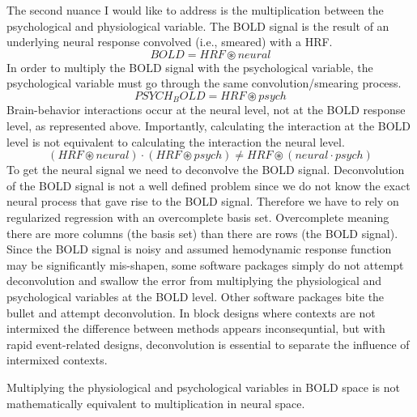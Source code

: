 \documentclass[phd,appendix,figures]{uithesis}
\begin{document}
The second nuance I would like to address is the multiplication between
the psychological and physiological variable.
The BOLD signal is the result of an underlying neural response convolved (i.e., smeared)
with a HRF.
\begin{equation}
	BOLD = HRF \circledast neural
\end{equation}
In order to multiply the BOLD signal with the psychological variable,
the psychological variable must go through the same convolution/smearing process.
\begin{equation}
	PSYCH_BOLD = HRF \circledast psych
\end{equation}
Brain-behavior interactions occur at the neural level, not at the
BOLD response level, as represented above.
Importantly, calculating the interaction at the BOLD level is not
equivalent to calculating the interaction the neural level.
\begin{equation}
	(HRF \circledast neural) \cdot (HRF \circledast psych) \neq HRF \circledast (neural \cdot psych)
\end{equation}
To get the neural signal we need to deconvolve the BOLD signal.
Deconvolution of the BOLD signal is not a well defined problem since
we do not know the exact neural process that gave rise to the BOLD signal.
Therefore we have to rely on regularized regression with an overcomplete
basis set.
Overcomplete meaning there are more columns (the basis set) than there
are rows (the BOLD signal).
Since the BOLD signal is noisy and assumed hemodynamic response function
may be significantly mis-shapen, some software packages simply do not attempt
deconvolution and swallow the error from multiplying the physiological and psychological
variables at the BOLD level.
Other software packages bite the bullet and attempt deconvolution.
In block designs where contexts are not intermixed the difference between
methods appears inconsequntial, but with rapid event-related designs,
deconvolution is essential to separate the influence of intermixed contexts.


Multiplying the physiological and psychological variables in BOLD space
is not mathematically equivalent to multiplication in neural space.
\end{document}
